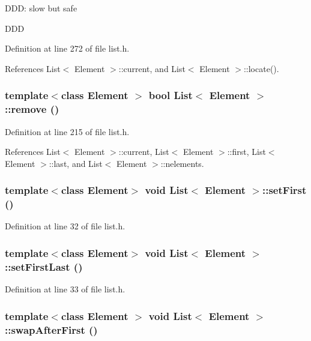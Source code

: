 DDD: slow but safe

DDD 

Definition at line 272 of file list.h.

References List$<$ Element $>$::current, and List$<$ Element $>$::locate().\hypertarget{classList_33f0e5433999d425b9f96570e2920c44}{
\subsubsection[{remove}]{\setlength{\rightskip}{0pt plus 5cm}template$<$class Element $>$ bool {\bf List}$<$ Element $>$::remove ()}}
\label{classList_33f0e5433999d425b9f96570e2920c44}




Definition at line 215 of file list.h.

References List$<$ Element $>$::current, List$<$ Element $>$::first, List$<$ Element $>$::last, and List$<$ Element $>$::nelements.\hypertarget{classList_79098dd3b93d00c5d2d4fa7f7cfcfd7e}{
\subsubsection[{setFirst}]{\setlength{\rightskip}{0pt plus 5cm}template$<$class Element$>$ void {\bf List}$<$ Element $>$::setFirst ()}}
\label{classList_79098dd3b93d00c5d2d4fa7f7cfcfd7e}




Definition at line 32 of file list.h.\hypertarget{classList_283cd30e6cdd0223d137b2a0ff77bfe1}{
\subsubsection[{setFirstLast}]{\setlength{\rightskip}{0pt plus 5cm}template$<$class Element$>$ void {\bf List}$<$ Element $>$::setFirstLast ()}}
\label{classList_283cd30e6cdd0223d137b2a0ff77bfe1}




Definition at line 33 of file list.h.\hypertarget{classList_16a214a0049ad988ca5ca33bd5723a70}{
\subsubsection[{swapAfterFirst}]{\setlength{\rightskip}{0pt plus 5cm}template$<$class Element $>$ void {\bf List}$<$ Element $>$::swapAfterFirst ()}}
\label{classList_16a214a0049ad988ca5ca33bd5723a70}




